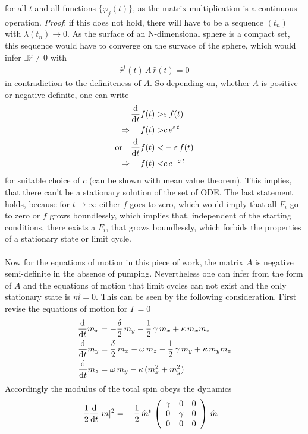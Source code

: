     for all $t$ and all functions $\{\varphi_j(t)\}$, as the matrix multiplication is a continuous operation. \textit{Proof}: if this does not hold, there will have to be a sequence $(t_n)$ with $\lambda(t_n)\rightarrow0$. As the surface of an N-dimensional sphere is a compact set, this sequence would have to converge on the survace of the sphere, which would infer $\exists \hat{r}\neq0$ with 
    \begin{align*}
        \hat{r}^t(t)\,A\,\hat{r}(t)=0
    \end{align*}
    in contradiction to the definiteness of $A$. So depending on, whether $A$ is positive or negative definite, one can write
    \begin{align*}
        \frac{\text{d}}{\text{d}t} f(t) >& \varepsilon\,f(t)\\
        \Rightarrow\quad f(t) >& c\,e^{\varepsilon\,t}\\
        \text{or}\quad \frac{\text{d}}{\text{d}t} f(t) <& -\varepsilon\,f(t)\\
        \Rightarrow\quad f(t) <& c\,e^{-\varepsilon\,t}\\
    \end{align*}
    for suitable choice of $c$ (can be shown with mean value theorem). This implies, that there can't be a stationary solution of the set of ODE. The last statement holds, because for $t\rightarrow\infty$ either $f$ goes to zero, which would imply that all $F_i$ go to zero or $f$ grows boundlessly, which implies that, independent of the starting conditions, there exists a $F_i$, that grows boundlessly, which forbids the properties of a stationary state or limit cycle.\\\\Now for the equations of motion in this piece of work, the matrix $A$ is negative semi-definite in the absence of pumping. Nevertheless one can infer from the form of $A$ and the equations of motion that limit cycles can not exist and the only stationary state is $\vec{m}=0$. This can be seen by the following consideration. First revise the equations of motion for $\Gamma=0$
    \begin{align*}
        \frac{\text{d}}{\text{d}t} m_x &= -\frac{\delta}{2}\,m_y-\frac{1}{2}\,\gamma\,m_x+\kappa\,m_x m_z\\
        \frac{\text{d}}{\text{d}t} m_y &= \frac{\delta}{2}\,m_x-\omega\,m_z-\frac{1}{2}\,\gamma\,m_y+\kappa\,m_y m_z\\
        \frac{\text{d}}{\text{d}t} m_z &= \omega\,m_y - \kappa\,(m_x^2+m_y^2)
    \end{align*}
    Accordingly the modulus of the total spin obeys the dynamics
    \begin{align*}
        \frac{1}{2}\frac{\text{d}}{\text{d}t} |m|^2=&-\frac{1}{2}\,\hat{m}^t\,\left( \begin{array}{ccc}
            \gamma & 0&0  \\
            0& \gamma & 0\\
            0&0&0
       \end{array}\right)\,\hat{m}
    \end{align*}

